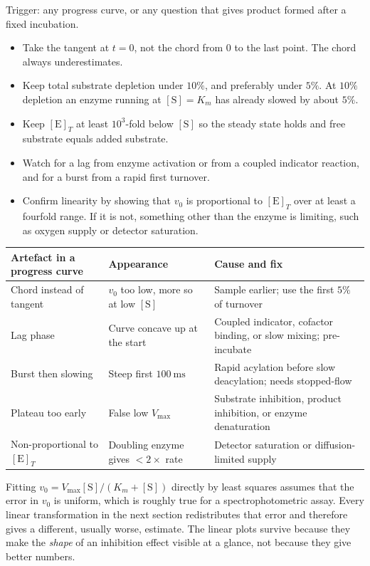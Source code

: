 \begin{tipbox}[title={TECHNIQUE: making sure a rate is an initial rate}]
Trigger: any progress curve, or any question that gives product formed after a fixed
incubation.
\begin{itemize}
\item Take the tangent at $t=0$, not the chord from $0$ to the last point. The chord
always underestimates.
\item Keep total substrate depletion under $10\%$, and preferably under $5\%$. At
$10\%$ depletion an enzyme running at $[\mathrm{S}]=K_m$ has already slowed by about
$5\%$.
\item Keep $[\mathrm{E}]_T$ at least $10^{3}$-fold below $[\mathrm{S}]$ so the steady
state holds and free substrate equals added substrate.
\item Watch for a lag from enzyme activation or from a coupled indicator reaction, and
for a burst from a rapid first turnover.
\item Confirm linearity by showing that $v_0$ is proportional to $[\mathrm{E}]_T$ over
at least a fourfold range. If it is not, something other than the enzyme is limiting,
such as oxygen supply or detector saturation.
\end{itemize}
\end{tipbox}

\begin{tabular}{@{}p{3.1cm}p{3.6cm}p{3.6cm}@{}}
\toprule
\textbf{Artefact in a progress curve} & \textbf{Appearance} & \textbf{Cause and fix}\\
\midrule
Chord instead of tangent & $v_0$ too low, more so at low $[\mathrm{S}]$ & Sample earlier; use the first $5\%$ of turnover\\
Lag phase & Curve concave up at the start & Coupled indicator, cofactor binding, or slow mixing; pre-incubate\\
Burst then slowing & Steep first $100\ \mathrm{ms}$ & Rapid acylation before slow deacylation; needs stopped-flow\\
Plateau too early & False low $V_{\max}$ & Substrate inhibition, product inhibition, or enzyme denaturation\\
Non-proportional to $[\mathrm{E}]_T$ & Doubling enzyme gives $<2\times$ rate & Detector saturation or diffusion-limited supply\\
\bottomrule
\end{tabular}

\begin{obsbox}[title={WORTH NOTICING: why non-linear fitting beat the linear plots}]
Fitting $v_0=V_{\max}[\mathrm{S}]/(K_m+[\mathrm{S}])$ directly by least squares assumes
that the error in $v_0$ is uniform, which is roughly true for a spectrophotometric
assay. Every linear transformation in the next section redistributes that error and
therefore gives a different, usually worse, estimate. The linear plots survive because
they make the \emph{shape} of an inhibition effect visible at a glance, not because
they give better numbers.
\end{obsbox}
